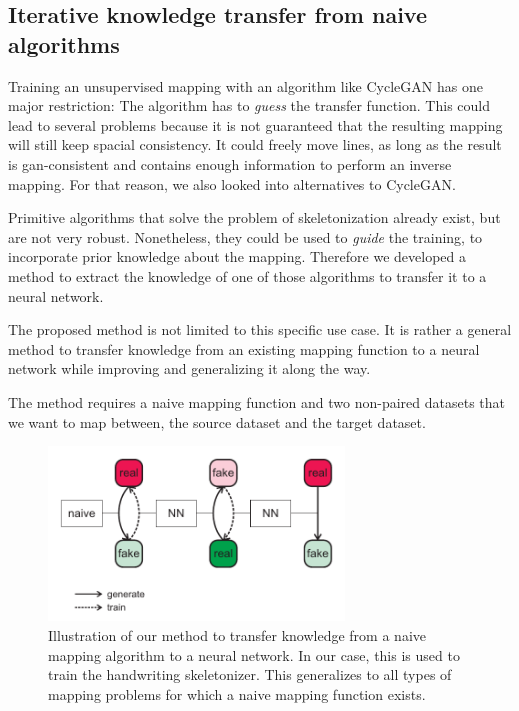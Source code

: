 \subsection{Iterative knowledge transfer from naive algorithms}\label{iterativeTransfer}

Training an unsupervised mapping with an algorithm like \gls{CycleGAN} has one major restriction: The algorithm has to \emph{guess} the transfer function. This could lead to several problems because it is not guaranteed that the resulting mapping will still keep spacial consistency. It could freely move lines, as long as the result is \gls{gan}-consistent and contains enough information to perform an inverse mapping. For that reason, we also looked into alternatives to \gls{CycleGAN}.

Primitive algorithms that solve the problem of skeletonization already exist, but are not very robust. Nonetheless, they could be used to \emph{guide} the training, to incorporate prior knowledge about the mapping. Therefore we developed a method to extract the knowledge of one of those algorithms to transfer it to a neural network.

The proposed method is not limited to this specific use case. It is rather a general method to transfer knowledge from an existing mapping function to a neural network while improving and generalizing it along the way.

The method requires a naive mapping function and two non-paired datasets that we want to map between, the source dataset and the target dataset.

\begin{figure}
  \centering
  \includegraphics[width=0.7\textwidth]{../assets/pix2pixTransfer.pdf}
  \caption[Knowledge transfer from a naive mapping algorithm to a neural network]{Illustration of our method to transfer knowledge from a naive mapping algorithm to a neural network. In our case, this is used to train the handwriting skeletonizer. This generalizes to all types of mapping problems for which a naive mapping function exists.}
  \label{pix2pixTransfer}
\end{figure}


